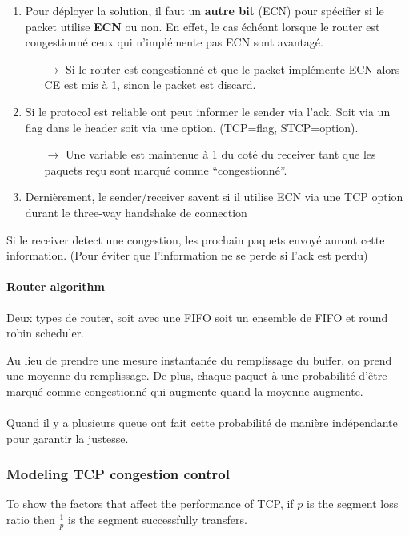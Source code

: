 \begin{enumerate}
    \item Pour déployer la solution, il faut un \textbf{autre bit} (ECN) pour spécifier si le packet utilise
        \textbf{ECN} ou non. En effet, le cas échéant lorsque le router est congestionné ceux qui
        n'implémente pas ECN sont avantagé.
        \begin{itemize}
            \item[$\to$] Si le router est congestionné et que le packet implémente ECN alors CE est mis à 1, sinon le packet est discard.
        \end{itemize}
    \item Si le protocol est reliable ont peut informer le sender via l'ack. Soit via
        un flag dans le header soit via une option. (TCP=flag, STCP=option).
        \begin{itemize}
            \item[$\to$] Une variable est maintenue à 1 du coté du receiver tant que 
                les paquets reçu sont marqué comme ``congestionné''.
        \end{itemize}
    \item Dernièrement, le sender/receiver savent si il utilise ECN via une TCP option
        durant le three-way handshake de connection
\end{enumerate}

Si le receiver detect une congestion, les prochain paquets envoyé auront cette information.
(Pour éviter que l'information ne se perde si l'ack est perdu)

\paragraph{Router algorithm}
Deux types de router, soit avec une FIFO soit un ensemble de FIFO et round robin scheduler.

Au lieu de prendre une mesure instantanée du remplissage du buffer, on prend une moyenne
du remplissage.
De plus, chaque paquet à une probabilité d'être marqué comme congestionné qui augmente
quand la moyenne augmente.

\paragraph{}
Quand il y a plusieurs queue ont fait cette probabilité de manière indépendante pour
garantir la justesse.

\subsubsection{Modeling TCP congestion control}
To show the factors that affect the performance of TCP,
if $p$ is the segment loss ratio then $\frac{1}{p}$ is the segment successfully transfers.

